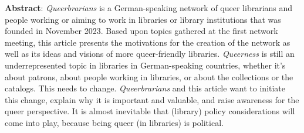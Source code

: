 \textbf{Abstract}: \textit{Queerbrarians} is a German-speaking network of
queer librarians and people working or aiming to work in libraries or
library institutions that was founded in November 2023. Based upon
topics gathered at the first network meeting, this article presents the
motivations for the creation of the network as well as its ideas and
visions of more queer-friendly libraries. \textit{Queerness} is still an
underrepresented topic in libraries in German-speaking countries,
whether it's about patrons, about people working in libraries, or about
the collections or the catalogs. This needs to change. \textit{Queerbrarians} and
this article want to initiate this change, explain why it is important
and valuable, and raise awareness for the queer perspective. It is
almost inevitable that (library) policy considerations will come into
play, because being queer (in libraries) is political.
